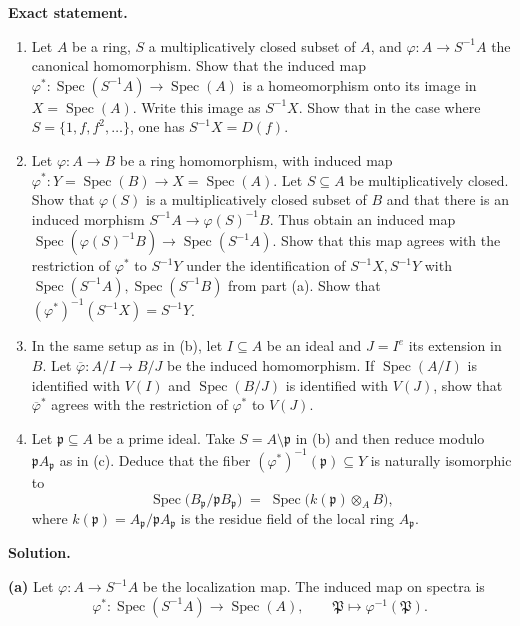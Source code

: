 \documentclass[12pt,a4paper]{article}
\DeclareMathOperator{\Spec}{Spec}
\theoremstyle{plain}
\theoremstyle{definition}      %
\begin{document}
	\textbf{Exact statement.}
	\begin{enumerate}[label=\textnormal{(\alph*)}]
		\item
		Let $A$ be a ring, $S$ a multiplicatively closed subset of $A$, and $\varphi:A\to S^{-1}A$ the canonical homomorphism.
		Show that the induced map $\varphi^*:\Spec(S^{-1}A)\to \Spec(A)$ is a homeomorphism onto its image in
		$X=\Spec(A)$. Write this image as $S^{-1}X$.
		Show that in the case where $S=\{1,f,f^2,\dots\}$, one has $S^{-1}X=D(f)$.
		
		\item
		Let $\varphi:A\to B$ be a ring homomorphism, with induced map $\varphi^*:Y=\Spec(B)\to X=\Spec(A)$.
		Let $S\subseteq A$ be multiplicatively closed. Show that $\varphi(S)$ is a multiplicatively closed subset of $B$ and that
		there is an induced morphism $S^{-1}A\to \varphi(S)^{-1}B$.
		Thus obtain an induced map $\Spec(\varphi(S)^{-1}B)\to \Spec(S^{-1}A)$.
		Show that this map agrees with the restriction of $\varphi^*$ to $S^{-1}Y$ under the identification of
		$S^{-1}X, S^{-1}Y$ with $\Spec(S^{-1}A), \Spec(S^{-1}B)$ from part (a).
		Show that $(\varphi^*)^{-1}(S^{-1}X)=S^{-1}Y$.
		
		\item
		In the same setup as in (b), let $I\subseteq A$ be an ideal and $J=I^e$ its extension in $B$.
		Let $\overline{\varphi}:A/I\to B/J$ be the induced homomorphism.
		If $\Spec(A/I)$ is identified with $V(I)$ and $\Spec(B/J)$ is identified with $V(J)$,
		show that $\overline{\varphi}^*$ agrees with the restriction of $\varphi^*$ to $V(J)$.
		
		\item
		Let $\mathfrak p\subseteq A$ be a prime ideal. Take $S=A\setminus\mathfrak p$ in (b) and then reduce modulo
		$\mathfrak pA_{\mathfrak p}$ as in (c). Deduce that the fiber $(\varphi^*)^{-1}(\mathfrak p)\subseteq Y$ is naturally
		isomorphic to
		\[
		\Spec\bigl(B_{\mathfrak p}/\mathfrak pB_{\mathfrak p}\bigr)
		\;=\;
		\Spec\bigl(k(\mathfrak p)\otimes_A B\bigr),
		\]
		where $k(\mathfrak p)=A_{\mathfrak p}/\mathfrak pA_{\mathfrak p}$ is the residue field of the local ring $A_{\mathfrak p}$.
	\end{enumerate}
	
	\textbf{Solution.}
	
	\textbf{(a)}
	Let $\varphi:A\to S^{-1}A$ be the localization map. The induced map on spectra is
	\[
	\varphi^*:\Spec(S^{-1}A)\to \Spec(A),\qquad \mathfrak P\mapsto \varphi^{-1}(\mathfrak P).
	\]
	
\end{document}
